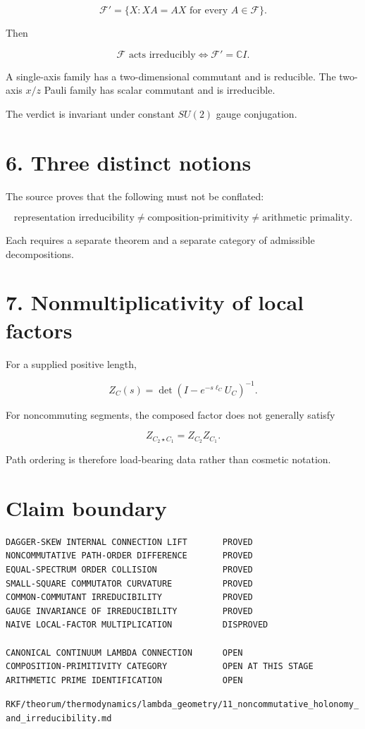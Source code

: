 \[
\mathcal F'=\{X:XA=AX\text{ for every }A\in\mathcal F\}.
\]

Then

\[
\boxed{
\mathcal F\text{ acts irreducibly}
\iff
\mathcal F'=\mathbb C I.
}
\]

A single-axis family has a two-dimensional commutant and is reducible. The two-axis \(x/z\) Pauli family has scalar commutant and is irreducible.

The verdict is invariant under constant \(SU(2)\) gauge conjugation.

\hypertarget{three-distinct-notions}{%
\section{6. Three distinct notions}\label{three-distinct-notions}}

The source proves that the following must not be conflated:

\[
\text{representation irreducibility}
\neq
\text{composition-primitivity}
\neq
\text{arithmetic primality}.
\]

Each requires a separate theorem and a separate category of admissible decompositions.

\hypertarget{nonmultiplicativity-of-local-factors}{%
\section{7. Nonmultiplicativity of local factors}\label{nonmultiplicativity-of-local-factors}}

For a supplied positive length,

\[
Z_C(s)=\det(I-e^{-s\ell_C}U_C)^{-1}.
\]

For noncommuting segments, the composed factor does not generally satisfy

\[
Z_{C_2\star C_1}=Z_{C_2}Z_{C_1}.
\]

Path ordering is therefore load-bearing data rather than cosmetic notation.

\hypertarget{claim-boundary}{%
\section{Claim boundary}\label{claim-boundary}}

\begin{verbatim}
DAGGER-SKEW INTERNAL CONNECTION LIFT       PROVED
NONCOMMUTATIVE PATH-ORDER DIFFERENCE       PROVED
EQUAL-SPECTRUM ORDER COLLISION             PROVED
SMALL-SQUARE COMMUTATOR CURVATURE          PROVED
COMMON-COMMUTANT IRREDUCIBILITY            PROVED
GAUGE INVARIANCE OF IRREDUCIBILITY         PROVED
NAIVE LOCAL-FACTOR MULTIPLICATION          DISPROVED

CANONICAL CONTINUUM LAMBDA CONNECTION      OPEN
COMPOSITION-PRIMITIVITY CATEGORY           OPEN AT THIS STAGE
ARITHMETIC PRIME IDENTIFICATION            OPEN
\end{verbatim}

\begin{flushright}\small\texttt{RKF/theorum/thermodynamics/lambda\_geometry/11\_noncommutative\_holonomy\_and\_irreducibility.md}\end{flushright}
